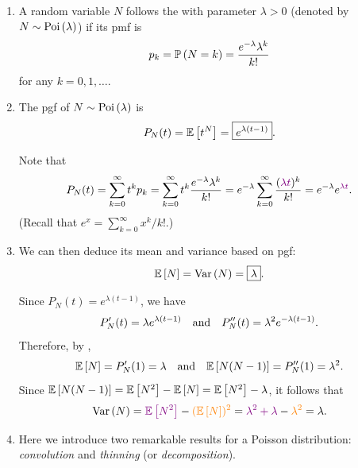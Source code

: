 \begin{enumerate}
\item A random variable \(N\) follows the  with
parameter \(\lambda>0\) (denoted by \(N\sim\operatorname{Poi}\left(\lambda\right)\)) if its pmf is
\[
p_k=\mathbb{P}\left(N=k\right)=\frac{e^{-\lambda}\lambda^k}{k!}
\]
for any \(k=0,1,\dotsc\).
\item \label{it:pois-pgf}
The pgf of \(N\sim\operatorname{Poi}\left(\lambda\right)\) is
\[
P_N(t)=\mathbb{E}\left[t^N\right]=\boxed{e^{\lambda(t-1)}}.
\]
\begin{pf}
Note that
\[
P_N(t)=\sum_{k=0}^{\infty}t^kp_k
=\sum_{k=0}^{\infty}t^k\frac{e^{-\lambda}\lambda^k}{k!}
=e^{-\lambda}\sum_{k=0}^{\infty}\frac{({\color{violet}\lambda t})^k}{k!}
=e^{-\lambda}e^{\color{violet}\lambda t}.
\]
(Recall that \(e^x=\sum_{k=0}^{\infty}x^k/k!\).)
\end{pf}
\item \label{it:pois-mean-var}
We can then deduce its mean and variance based on pgf:
\[
\mathbb{E}\left[N\right]=\operatorname{Var}\left(N\right)=\boxed{\lambda}.
\]
\begin{pf}
Since \(P_N(t)=e^{\lambda(t-1)}\), we have
\[
P_N'(t)=\lambda e^{\lambda(t-1)}\qqtext{and}
P_N''(t)=\lambda^2 e^{-\lambda(t-1)}.
\]
Therefore, by ,
\[
\expv{N}=P_N'(1)=\lambda\qqtext{and}\expv{N(N-1)}=P_N''(1)=\lambda^2.
\]
Since \(\mathbb{E}\left[N(N-1)\right]=\mathbb{E}\left[N^2\right]-\mathbb{E}\left[N\right]=\mathbb{E}\left[N^2\right]-\lambda\), it follows that
\[
\operatorname{Var}\left(N\right)={\color{violet}\mathbb{E}\left[N^2\right]}-{\color{orange}(\mathbb{E}\left[N\right])^{2}}
={\color{violet}\lambda^2+\lambda}-{\color{orange}\lambda^2}
=\lambda.
\]
\end{pf}

\item Here we introduce two remarkable results for a Poisson distribution:
\emph{convolution} and \emph{thinning} (or \emph{decomposition}).


\end{enumerate}
